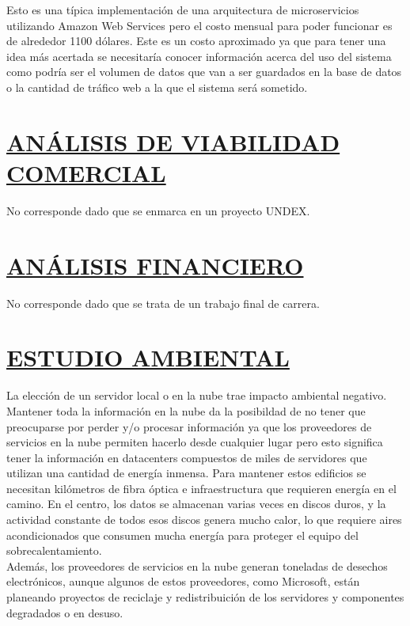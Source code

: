 Esto es una típica implementación de una arquitectura de microservicios utilizando Amazon Web Services pero el costo mensual para poder funcionar es de alrededor 1100 dólares. Este es un costo aproximado ya que para tener una idea más acertada se necesitaría conocer información acerca del uso del sistema como podría ser el volumen de datos que van a ser guardados en la base de datos o la cantidad de tráfico web a la que el sistema será sometido.\\

\section*{\underline{ANÁLISIS DE VIABILIDAD COMERCIAL}}
No corresponde dado que se enmarca en un proyecto UNDEX.\\


\section*{\underline{ANÁLISIS FINANCIERO}}
No corresponde dado que se trata de un trabajo final de carrera.\\

\section*{\underline{ESTUDIO AMBIENTAL}}
La elección de un servidor local o en la nube trae impacto ambiental negativo.\\

Mantener toda la información en la nube da la posibildad de no tener que preocuparse por perder y/o procesar información ya que los proveedores de servicios en la nube permiten hacerlo desde cualquier lugar pero esto significa tener la información en datacenters compuestos de miles de servidores que utilizan una cantidad de energía inmensa. Para mantener estos edificios se necesitan kilómetros de fibra óptica e infraestructura que requieren energía en el camino. En el centro, los datos se almacenan varias veces en discos duros, y la actividad constante de todos esos discos genera mucho calor, lo que requiere aires acondicionados que consumen mucha energía para proteger el equipo del sobrecalentamiento.\\
Además, los proveedores de servicios en la nube generan toneladas de desechos electrónicos, aunque algunos de estos proveedores, como Microsoft, están planeando proyectos de reciclaje y redistribuición de los servidores y componentes degradados o en desuso.
\\

